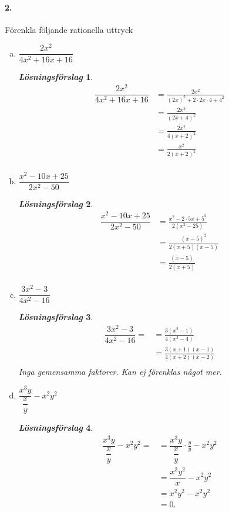 \documentclass[a4paper]{article}
\newtheorem*{sol}{\normalfont\textit{Lösningsförslag}}
\begin{document}
\paragraph{2.} Förenkla följande rationella uttryck
\begin{enumerate}[(a)]
\item $\dfrac{2x^2}{4x^2 + 16x +16}$
  \begin{sol}
    \begin{align*}
      \dfrac{2x^2}{4x^2 + 16x +16}
      &= \frac{2x^2}{(2x)^2 + 2\cdot 2x\cdot 4 + 4^2} \\[1em]
      &= \frac{2x^2}{(2x+4)^2} \\[1em]
      &= \frac{2x^2}{4(x+2)^2} \\[1em]
      &= \frac{x^2}{2(x+2)^2} \\[1em]
    \end{align*}
  \end{sol}
\item $\dfrac{x^2-10x+25}{2x^2-50}$
  \begin{sol}
    \begin{align*}
      \dfrac{x^2-10x+25}{2x^2-50}
      &= \frac{x^2 - 2\cdot 5x + 5^2}{2(x^2-25)} \\[1em]
      &= \frac{(x-5)^2}{2(x+5)(x-5)} \\[1em]
      &= \frac{(x-5)}{2(x+5)} \\[1em]
    \end{align*}
  \end{sol}
\item $\dfrac{3x^2-3}{4x^2 -16}$
  \begin{sol}
    \begin{align*}
      \dfrac{3x^2-3}{4x^2 -16} =
      &= \frac{3(x^2-1)}{4(x^2-4)} \\[1em]
      &= \frac{3(x+1)(x-1)}{4(x+2)(x-2)} \\[1em]
    \end{align*}
    Inga gemensamma faktorer. Kan ej förenklas något mer.
  \end{sol}
\item $\dfrac{x^3y}{\dfrac{x}{y}} - x^2y^2$
  \begin{sol}
    \begin{align*}
      \dfrac{x^3y}{\dfrac{x}{y}} - x^2y^2 =
      &= \dfrac{x^3y}{\dfrac{x}{y}}\cdot \frac{y}{y} - x^2y^2 \\[1em]
      &= \dfrac{x^3y^2}{x} - x^2y^2 \\[1em]
      &= x^2y^2 - x^2y^2 \\[1em]
      &= 0.
    \end{align*}
  \end{sol}
\end{enumerate}
\end{document}
